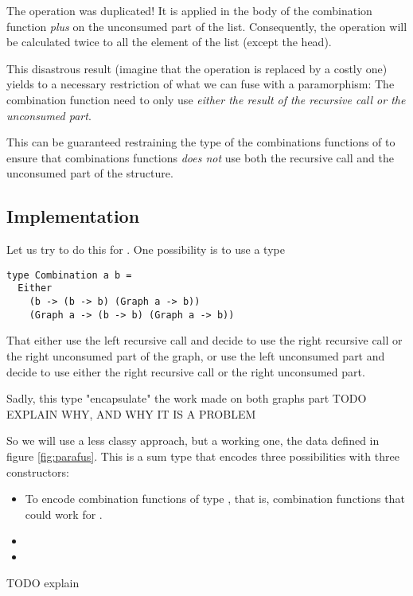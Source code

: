 The  operation was duplicated! It is applied in the body of the combination function \emph{plus} on the unconsumed part of the list. Consequently, the  operation will be calculated twice to all the element of the list (except the head).

This disastrous result (imagine that the  operation is replaced by a costly one) yields to a necessary restriction of what we can fuse with a paramorphism:
The combination function need to only use \emph{either the result of the recursive call or the unconsumed part}.

This can be guaranteed restraining the type of the combinations functions of  to ensure that combinations functions \emph{does not} use both the recursive call and the unconsumed part of the structure.

\subsection{Implementation}

Let us try to do this for .
One possibility is to use a type
\begin{verbatim}
type Combination a b =
  Either
    (b -> (b -> b) (Graph a -> b))
    (Graph a -> (b -> b) (Graph a -> b))
\end{verbatim}

That either use the left recursive call and decide to use the right recursive call or the right unconsumed part of the graph, or use the left unconsumed part and decide to use either the right recursive call or the right unconsumed part.

Sadly, this type "encapsulate" the work made on both graphs part TODO EXPLAIN WHY, AND WHY IT IS A PROBLEM

So we will use a less classy approach, but a working one, the  data defined in figure \ref{fig:parafus}. This is a sum type that encodes three possibilities with three constructors:
\begin{itemize}
\item[\minline{B.}] To encode combination functions of type , that is, combination functions that could work for .
\item[\minline{L.}]
\item[\minline{R.}]
\end{itemize}

TODO explain

